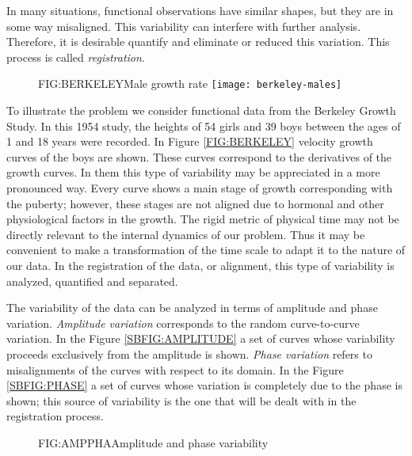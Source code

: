 In many situations, functional observations have
similar shapes, but they are in some way misaligned. This variability can
interfere with further analysis. Therefore, it is desirable quantify and
eliminate or reduced this variation. This process is called \textit{registration}.


\begin{figure}[Male growth rate]{FIG:BERKELEY}{Male growth rate}
	\texttt{[image: berkeley-males]}
\end{figure}

To illustrate the problem we consider functional data from the Berkeley Growth
Study\cite{berkeley}. In this 1954 study, the heights of 54
girls and 39 boys between the ages of 1 and 18 years were recorded. In Figure
\ref{FIG:BERKELEY} velocity growth curves of the boys are shown.
These curves correspond to the derivatives of the growth curves. In them this
type of variability may be appreciated in a more pronounced way.
Every curve shows a main stage of growth corresponding with the puberty;
however, these stages are not aligned due to hormonal and other
physiological factors in the growth. The rigid metric of physical time may not
be directly relevant to the internal dynamics of our problem. Thus it may be
convenient to make a transformation of the time scale to adapt it to the nature
of our data. In the registration of the data, or alignment, this type of
variability is analyzed, quantified and separated.


The variability of the data can be analyzed in terms of amplitude and
phase variation. \textit{Amplitude variation} corresponds to the
random curve-to-curve variation.
In the Figure \ref{SBFIG:AMPLITUDE} a
set of curves whose variability proceeds exclusively from the amplitude is shown.
\textit{Phase variation} refers to
misalignments of the curves with respect to its
domain. In the Figure
\ref{SBFIG:PHASE} a set of curves whose variation is completely due
to the phase is shown; this source of variability is the one that will be dealt with in
the registration process.

\begin{figure}[Amplitude and phase variability]{FIG:AMPPHA}{Amplitude and phase variability}
   \quad
\end{figure}
